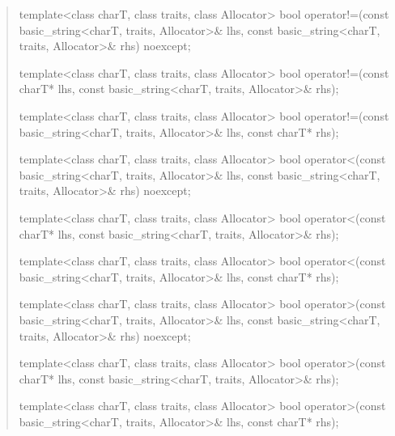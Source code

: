 \documentclass{wg21}
\begin{document}
\begin{quote}
\begin{itemdecl}
template<class charT, class traits, class Allocator>
  bool operator!=(const basic_string<charT, traits, Allocator>& lhs,
                  const basic_string<charT, traits, Allocator>& rhs) noexcept;
\end{itemdecl}

\begin{itemdecl}
template<class charT, class traits, class Allocator>
  bool operator!=(const charT* lhs, const basic_string<charT, traits, Allocator>& rhs);
\end{itemdecl}

\begin{itemdecl}
template<class charT, class traits, class Allocator>
  bool operator!=(const basic_string<charT, traits, Allocator>& lhs, const charT* rhs);
\end{itemdecl}

\begin{itemdecl}
template<class charT, class traits, class Allocator>
  bool operator<(const basic_string<charT, traits, Allocator>& lhs,
                 const basic_string<charT, traits, Allocator>& rhs) noexcept;
\end{itemdecl}

\begin{itemdecl}
template<class charT, class traits, class Allocator>
  bool operator<(const charT* lhs, const basic_string<charT, traits, Allocator>& rhs);
\end{itemdecl}

\begin{itemdecl}
template<class charT, class traits, class Allocator>
  bool operator<(const basic_string<charT, traits, Allocator>& lhs, const charT* rhs);
\end{itemdecl}

\begin{itemdecl}
template<class charT, class traits, class Allocator>
  bool operator>(const basic_string<charT, traits, Allocator>& lhs,
                 const basic_string<charT, traits, Allocator>& rhs) noexcept;
\end{itemdecl}

\begin{itemdecl}
template<class charT, class traits, class Allocator>
  bool operator>(const charT* lhs, const basic_string<charT, traits, Allocator>& rhs);
\end{itemdecl}

\begin{itemdecl}
template<class charT, class traits, class Allocator>
  bool operator>(const basic_string<charT, traits, Allocator>& lhs, const charT* rhs);
\end{itemdecl}


\end{quote}
\end{document}
